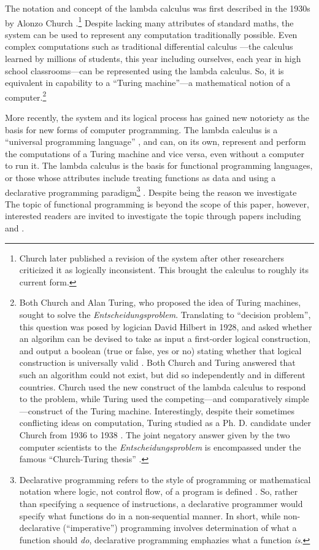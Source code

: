 \documentclass[twocolumn,titlepage,12pt]{article}
\begin{document}
The notation and concept of the lambda calculus was first described in the 1930s by Alonzo Church \cite{church}.\footnote{Church later published a revision \cite{church2} of the system after other researchers\cite{logicallyinconsistent} criticized it as logically inconsistent. This brought the calculus to roughly its current form.} Despite lacking many attributes of standard maths, the system can be used to represent any computation traditionally possible. Even complex computations such as traditional differential calculus \cite{differentiallc}---the calculus learned by millions of students, this year including ourselves, each year in high school classrooms---can be represented using the lambda calculus. So, it is equivalent in capability to a ``Turing machine''---a mathematical notion of a computer.\footnote{Both Church and Alan Turing, who proposed the idea of Turing machines, sought to solve the \textit{Entscheidungsproblem}. Translating to ``decision problem'', this question was posed by logician David Hilbert in 1928, and asked whether an algorihm can be devised to take as input a first-order logical construction, and output a boolean (true or false, yes or no) stating whether that logical construction is universally valid \cite{hilbert}. Both Church and Turing answered that such an algorithm could not exist, but did so independently and in different countries. Church used the new construct of the lambda calculus to respond to the problem, while Turing used the competing---and comparatively simple---construct of the Turing machine. Interestingly, despite their sometimes conflicting ideas on computation, Turing studied as a Ph. D. candidate under Church from 1936 to 1938 \cite{churchpapers}. The joint negatory answer given by the two computer scientists to the \textit{Entscheidungsproblem} is encompassed under the famous ``Church-Turing thesis'' \cite{churchturingthesis}.}

More recently, the system and its logical process has gained new notoriety as the basis for new forms of computer programming. The lambda calculus is a ``universal programming language'' \cite{rojastutorial}, and can, on its own, represent and perform the computations of a Turing machine and vice versa, even without a computer to run it. The lambda calculus is the basis for functional programming languages, or those whose attributes include treating functions as data and using a declarative programming paradigm\footnote{Declarative programming refers to the style of programming or mathematical notation where logic, not control flow, of a program is defined \cite{declarativeprogadv}. So, rather than specifying a sequence of instructions, a declarative programmer would specify what functions do in a non-sequential manner. In short, while non-declarative (``imperative'') programming involves determination of what a function should \textit{do}, declarative programming emphazies what a function \textit{is}.} \cite{hudakevolution}. Despite being the reason we investigate The topic of functional programming is beyond the scope of this paper, however, interested readers are invited to investigate the topic through papers including \cite{totalfp} and \cite{hudakevolution}.
\end{document}
